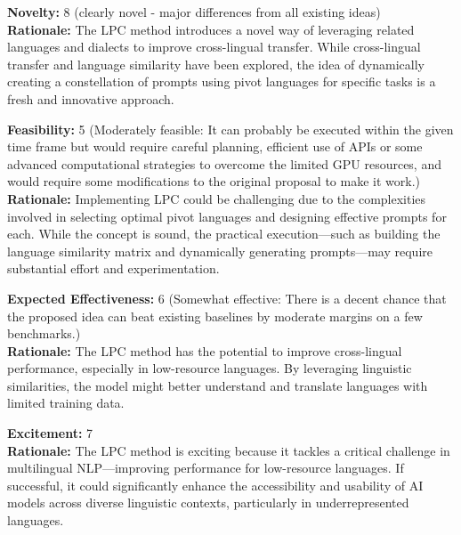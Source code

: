 \vspace{20pt}

\begin{tcolorbox}[colback=green!10!white, colframe=green!80!black, title=\textbf{Reviewer 2}]
\small
\textbf{Novelty:} 8 (clearly novel - major differences from all existing ideas)\\
\textbf{Rationale:} The LPC method introduces a novel way of leveraging related languages and dialects to improve cross-lingual transfer. While cross-lingual transfer and language similarity have been explored, the idea of dynamically creating a constellation of prompts using pivot languages for specific tasks is a fresh and innovative approach.

\vspace{10pt}

\textbf{Feasibility:} 5 (Moderately feasible: It can probably be executed within the given time frame but would require careful planning, efficient use of APIs or some advanced computational strategies to overcome the limited GPU resources, and would require some modifications to the original proposal to make it work.)\\
\textbf{Rationale:} Implementing LPC could be challenging due to the complexities involved in selecting optimal pivot languages and designing effective prompts for each. While the concept is sound, the practical execution—such as building the language similarity matrix and dynamically generating prompts—may require substantial effort and experimentation.

\vspace{10pt}

\textbf{Expected Effectiveness:} 6 (Somewhat effective: There is a decent chance that the proposed idea can beat existing baselines by moderate margins on a few benchmarks.)\\
\textbf{Rationale:} The LPC method has the potential to improve cross-lingual performance, especially in low-resource languages. By leveraging linguistic similarities, the model might better understand and translate languages with limited training data.

\vspace{10pt}

\textbf{Excitement:} 7\\
\textbf{Rationale:} The LPC method is exciting because it tackles a critical challenge in multilingual NLP—improving performance for low-resource languages. If successful, it could significantly enhance the accessibility and usability of AI models across diverse linguistic contexts, particularly in underrepresented languages.


\end{tcolorbox}
